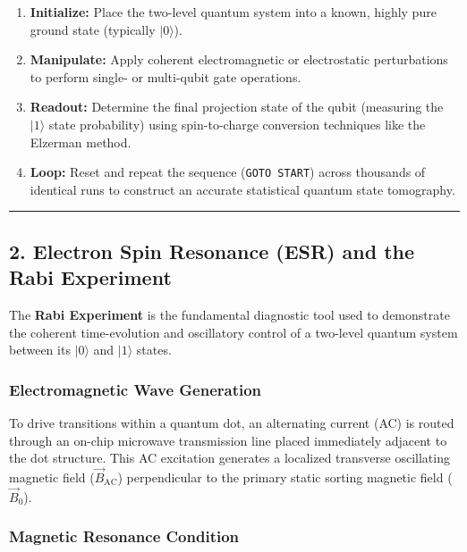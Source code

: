 \documentclass[
]{article}
\providecommand{\tightlist}{%
  \setlength{\itemsep}{0pt}\setlength{\parskip}{0pt}}
\begin{document}
\begin{enumerate}
\def\labelenumi{\arabic{enumi}.}
\tightlist
\item
  \textbf{Initialize:} Place the two-level quantum system into a known,
  highly pure ground state (typically \(|0\rangle\)).
\item
  \textbf{Manipulate:} Apply coherent electromagnetic or electrostatic
  perturbations to perform single- or multi-qubit gate operations.
\item
  \textbf{Readout:} Determine the final projection state of the qubit
  (measuring the \(|1\rangle\) state probability) using spin-to-charge
  conversion techniques like the Elzerman method.
\item
  \textbf{Loop:} Reset and repeat the sequence (\texttt{GOTO\ START})
  across thousands of identical runs to construct an accurate
  statistical quantum state tomography.
\end{enumerate}

\begin{center}\rule{0.5\linewidth}{0.5pt}\end{center}

\subsection{2. Electron Spin Resonance (ESR) and the Rabi
Experiment}\label{electron-spin-resonance-esr-and-the-rabi-experiment}

The \textbf{Rabi Experiment} is the fundamental diagnostic tool used to
demonstrate the coherent time-evolution and oscillatory control of a
two-level quantum system between its \(|0\rangle\) and \(|1\rangle\)
states.

\subsubsection{Electromagnetic Wave
Generation}\label{electromagnetic-wave-generation}

To drive transitions within a quantum dot, an alternating current (AC)
is routed through an on-chip microwave transmission line placed
immediately adjacent to the dot structure. This AC excitation generates
a localized transverse oscillating magnetic field
(\(\vec{B}_{\text{AC}}\)) perpendicular to the primary static sorting
magnetic field (\(\vec{B}_0\)).

\subsubsection{Magnetic Resonance
Condition}\label{magnetic-resonance-condition}
\end{document}
